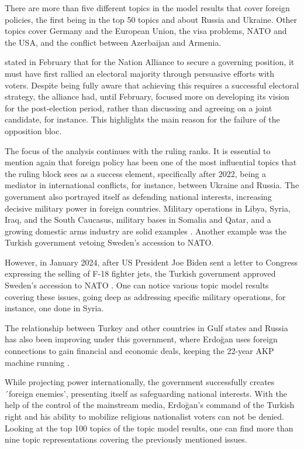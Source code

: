 There are more than five different topics in the model results that cover foreign policies, the 
first being in the top 50 topics and about Russia and Ukraine. Other topics cover Germany and the 
European Union, the visa problems, NATO and the USA, and the conflict between Azerbaijan and Armenia.

\textcite{edgar_sar_opposition_election_agenda_2023} stated in February that for the Nation Alliance to 
secure a governing position, it must have first rallied an electoral majority through persuasive efforts 
with voters. Despite being fully aware that achieving this requires a successful electoral strategy, the 
alliance had, until February, focused more on developing its vision for the post-election period, rather 
than discussing and agreeing on a joint candidate, for instance. This highlights the main reason for the 
failure of the opposition bloc.

The focus of the analysis continues with the ruling ranks. It is essential to mention again that 
foreign policy has been one of the most influential topics that the ruling block sees as a success 
element, specifically after 2022, being a mediator in international conflicts, for instance, between 
Ukraine and Russia. The government also portrayed itself as defending national interests, increasing 
decisive military power in foreign countries. Mili­tary operations in Libya, Syria, Iraq, and the 
South Caucasus, military bases in Somalia and Qatar, and a growing domestic arms industry are solid 
examples \parencite{cevik_aksoy_turkey_earthquake_2023}. Another example was the Turkish government 
vetoing Sweden's accession to NATO. 

However, in January 2024, after US President Joe Biden sent a letter to Congress expressing the 
selling of F-18 fighter jets, the Turkish government approved Sweden's accession to 
NATO \parencite{euronews_sweden_f18_2024}. One can notice various topic model results covering 
these issues, going deep as addressing specific military operations, for instance, one done in Syria.

The relationship between Turkey and other countries in Gulf states and Russia has also been improving 
under this government, where Erdo­ğan uses foreign connections to gain financial and economic deals, 
keeping the 22-year AKP machine running \parencite{cevik_aksoy_aydin_turkey_after_elections_2023}.

While projecting power internationally, the government successfully creates ´foreign enemies', 
presenting itself as safeguarding national interests. With the help of the control of the mainstream 
media, Erdoğan's command of the Turkish right and his ability to mobilize religious nationalist 
voters can not be denied. Looking at the top 100 topics of the topic model results, one can find more 
than nine topic representations covering the previously mentioned issues. 

